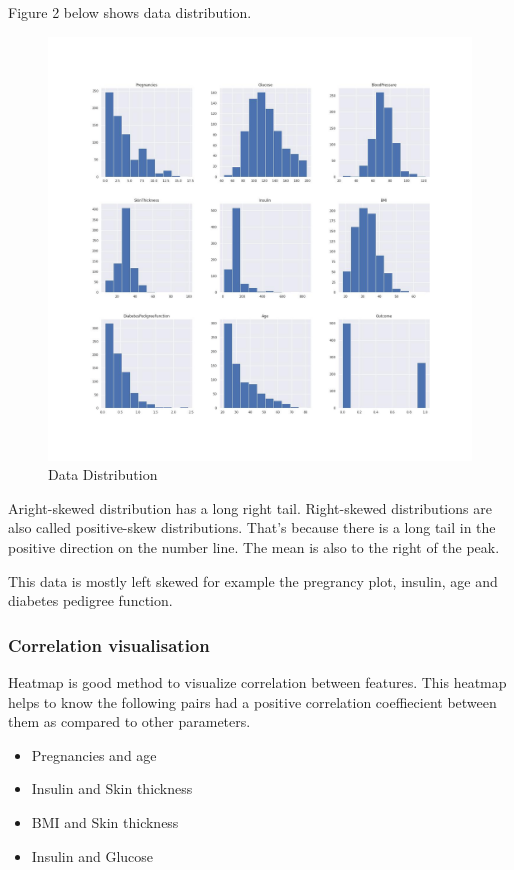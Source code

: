\documentclass[
]{article}
\providecommand{\tightlist}{%
  \setlength{\itemsep}{0pt}\setlength{\parskip}{0pt}}
\begin{document}
Figure 2 below shows data distribution.

\begin{figure}
\centering
\includegraphics{clean.jpg}
\caption{Data Distribution}
\end{figure}

Aright-skewed distribution has a long right tail. Right-skewed
distributions are also called positive-skew distributions. That's
because there is a long tail in the positive direction on the number
line. The mean is also to the right of the peak.

This data is mostly left skewed for example the pregrancy plot, insulin,
age and diabetes pedigree function.

\hypertarget{correlation-visualisation}{%
\subsubsection{Correlation
visualisation}\label{correlation-visualisation}}

Heatmap is good method to visualize correlation between features. This
heatmap helps to know the following pairs had a positive correlation
coeffiecient between them as compared to other parameters.

\begin{itemize}
\tightlist
\item
  Pregnancies and age
\item
  Insulin and Skin thickness
\item
  BMI and Skin thickness
\item
  Insulin and Glucose
\end{itemize}
\end{document}
